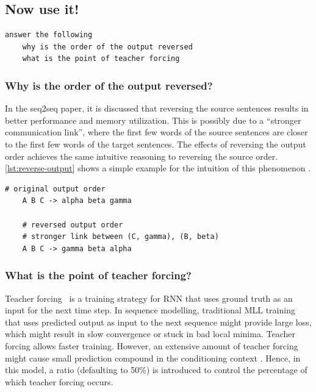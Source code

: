 \documentclass[twocolumn]{article}
\begin{document}
\subsection{Now use it!}

\begin{lstlisting}[caption={Decoded output.},language={}]
    answer the following
    why is the order of the output reversed
    what is the point of teacher forcing
\end{lstlisting}


\subsubsection{Why is the order of the output reversed?}

In the seq2seq paper, it is discussed that reversing the source sentences results in better performance and memory utilization. This is possibly due to a ``stronger communication link'', where the first few words of the source sentences are closer to the first few words of the target sentences. The effects of reversing the output order achieves the same intuitive reasoning to reversing the source order. \cref{lst:reverse-output} shows a simple example for the intuition of this phenomenon \autocite{NlpWhyWe}.

\begin{lstlisting}[caption={Effects of reversed output order.},language={}, label={lst:reverse-output}]
    # original output order
    A B C -> alpha beta gamma

    # reversed output order
    # stronger link between (C, gamma), (B, beta)
    A B C -> gamma beta alpha
\end{lstlisting}

\subsubsection{What is the point of teacher forcing?}

Teacher forcing~\autocite{williamsLearningAlgorithmContinually1989} is a training strategy for RNN that uses ground truth as an input for the next time step. In sequence modelling, traditional MLL training that uses predicted output as input to the next sequence might provide large loss, which might result in slow convergence or stuck in bad local minima. Teacher forcing allows faster training. However, an extensive amount of teacher forcing might cause small prediction compound in the conditioning context \autocite{lambProfessorForcingNew2016}. Hence, in this model, a ratio (defaulting to 50\%) is introduced to control the percentage of which teacher forcing occurs.
\end{document}
